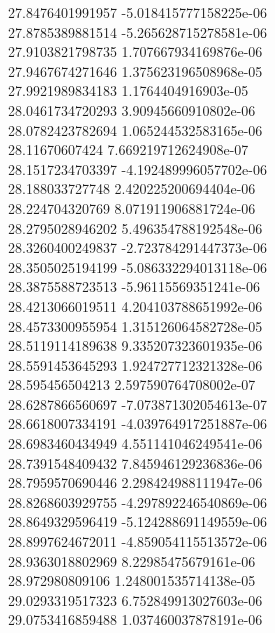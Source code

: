 {27.8476401991957 -5.018415777158225e-06
 \\
27.8785389881514 -5.265628715278581e-06
 \\
27.9103821798735 1.707667934169876e-06
 \\
27.9467674271646 1.375623196508968e-05
 \\
27.9921989834183 1.1764404916903e-05
 \\
28.0461734720293 3.90945660910802e-06
 \\
28.0782423782694 1.065244532583165e-06
 \\
28.11670607424 7.669219712624908e-07
 \\
28.1517234703397 -4.192489996057702e-06
 \\
28.188033727748 2.420225200694404e-06
 \\
28.224704320769 8.071911906881724e-06
 \\
28.2795028946202 5.496354788192548e-06
 \\
28.3260400249837 -2.723784291447373e-06
 \\
28.3505025194199 -5.086332294013118e-06
 \\
28.3875588723513 -5.96115569351241e-06
 \\
28.4213066019511 4.204103788651992e-06
 \\
28.4573300955954 1.315126064582728e-05
 \\
28.5119114189638 9.335207323601935e-06
 \\
28.5591453645293 1.924727712321328e-06
 \\
28.595456504213 2.597590764708002e-07
 \\
28.6287866560697 -7.073871302054613e-07
 \\
28.6618007334191 -4.039764917251887e-06
 \\
28.6983460434949 4.551141046249541e-06
 \\
28.7391548409432 7.845946129236836e-06
 \\
28.7959570690446 2.298424988111947e-06
 \\
28.8268603929755 -4.297892246540869e-06
 \\
28.8649329596419 -5.124288691149559e-06
 \\
28.8997624672011 -4.859054115513572e-06
 \\
28.9363018802969 8.22985475679161e-06
 \\
28.972980809106 1.248001535714138e-05
 \\
29.0293319517323 6.752849913027603e-06
 \\
29.0753416859488 1.037460037878191e-06
}
